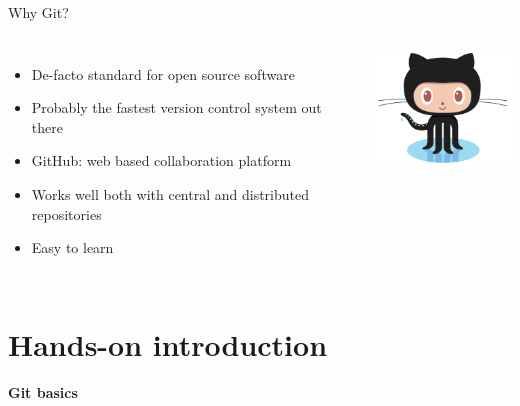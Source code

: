 \documentclass[18pt,mathserif]{beamer}
\begin{document}
\begin{frame}{Why Git?}
  \begin{columns}[T,onlytextwidth]
        \begin{itemize}
          \item De-facto standard for open source software
          \item Probably the fastest version control system out there
          \item GitHub: web based collaboration platform
					\item Works well both with central and distributed repositories
					\item Easy to learn
        \end{itemize}
      \centering
      \includegraphics[width=4.0cm]{images/octocat.png}
  \end{columns}
\end{frame}

\section{Hands-on introduction}

\begin{frame}{}
  \begin{center}
    \huge\bfseries
    \textcolor{KITblack}{Git basics}
  \end{center}
\end{frame}
\end{document}
